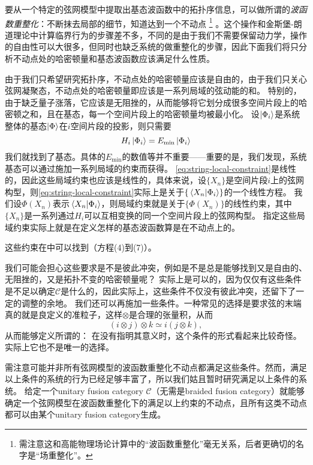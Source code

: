 要从一个特定的弦网模型中提取出基态波函数中的拓扑序信息，可以做所谓的\emph{波函数重整化}：不断抹去局部的细节，知道达到一个不动点%
\footnote{
    需注意这和高能物理场论计算中的“波函数重整化”毫无关系，后者更确切的名字是“场重整化”。
}%
。这个操作和金斯堡-朗道理论中计算临界行为的步骤差不多，不同的是由于我们不需要保留动力学，操作的自由性可以大很多，但同时也缺乏系统的做重整化的步骤，因此下面我们将只分析不动点处的哈密顿量和基态波函数应该满足什么性质。

由于我们只希望研究拓扑序，不动点处的哈密顿量应该是自由的，由于我们只关心弦网凝聚态，不动点处的哈密顿量即应该是一系列局域的弦动能的和。
特别的，由于缺乏量子涨落，它应该是无阻挫的，从而能够将它划分成很多空间片段上的哈密顿之和，且在基态，每一个空间片段上的哈密顿量均被最小化。
设$\ket{\Phi_i}$是系统整体的基态$\ket{\Phi}$在$i$空间片段的投影，则只需要
\begin{equation}
    H_i \ket{\Phi_i} = E_\text{min} \ket{\Phi_i}
    \label{eq:string-local-constraint}
\end{equation}
我们就找到了基态。具体的$E_\text{min}$的数值等并不重要——重要的是，我们发现，系统基态可以通过施加一系列局域的约束而获得。
\eqref{eq:string-local-constraint}是线性的，因此这些局域约束也应该是线性的，具体来说，设$\{X_n\}$是空间片段$i$上的弦网构型，则\eqref{eq:string-local-constraint}实际上是关于$\{ \braket*{X_n}{\Phi_i} \}$的一个线性方程。
我们设$\Phi(X_n)$表示$\braket*{X_n}{\Phi_i}$，则局域约束就是关于$\{\Phi(X_n)\}$的线性约束，其中$\{X_n\}$是一系列通过$H_i$可以互相变换的同一个空间片段上的弦网构型。
指定这些局域约束实际上就是在定义怎样的基态波函数算是在不动点上的。

这些约束在\cite{Levin_2005}中可以找到（方程(4)到(7)）。

我们可能会担心这些要求是不是彼此冲突，例如是不是总是能够找到又是自由的、无阻挫的，又是拓扑不变的哈密顿量呢？
实际上是可以的，因为仅仅有这些条件是不足以确定$\mathcal{C}$是什么的，因此实际上，这些条件不仅没有彼此冲突，还留下了一定的调整的余地。
我们还可以再施加一些条件。一种常见的选择是要求弦的末端真的就是良定义的准粒子，这样$\otimes$是合理的张量积，从而
\[
    (i \otimes j) \otimes k \simeq i (j \otimes k),
\]
从而能够定义所谓的：
在没有指明其意义时，这个条件的形式看起来比较奇怪。实际上它也不是唯一的选择。

需注意可能并非所有弦网模型的波函数重整化不动点都满足这些条件。然而，满足以上条件的系统的行为已经足够丰富了，所以我们姑且暂时研究满足以上条件的系统。
给定一个unitary fusion category $\mathcal{C}$（无需是braided fusion category）就能够确定一个弦网模型在波函数重整化下的满足以上约束的不动点，且所有这类不动点都可以由某个unitary fusion category生成。

